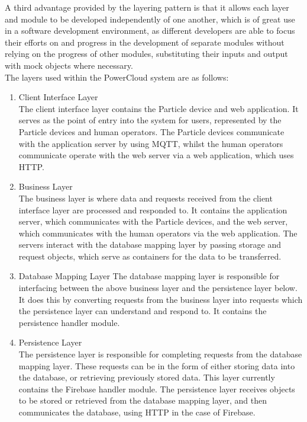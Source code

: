\documentclass{article}
\begin{document}
	A third advantage provided by the layering pattern is that it allows each 
	layer and module to be developed independently of one another, which is 
	of great use in a software development environment, as different 
	developers are able to focus their efforts on and progress in the 
	development of separate modules without relying on the progress of other 
	modules, substituting their inputs and output with mock objects where 
	necessary.\\
	
	\noindent
	The layers used within the PowerCloud system are as follows:\\
	
		\begin{enumerate}
			\item Client Interface Layer\\
			The client interface layer contains the Particle device and web 
			application. It serves as the point of entry into the system for 
			users, represented by the Particle devices and human operators. 
			The Particle devices communicate with the application server by 
			using MQTT, whilst the human operators communicate operate with 
			the web server via a web application, which uses HTTP.
			\item Business Layer\\
			The business layer is where data and requests received from the 
			client interface layer are processed and responded to. It 
			contains the application server, which communicates with the 
			Particle devices, and the web server, which communicates with the 
			human operators via the web application. The servers interact 
			with the database mapping layer by passing storage and request 
			objects, which serve as containers for the data to be transferred.
			\item Database Mapping Layer
			The database mapping layer is responsible for interfacing between 
			the above business layer and the persistence layer below. It does 
			this by converting requests from the business layer into requests 
			which the persistence layer can understand and respond to. It 
			contains the persistence handler module.
			\item Persistence Layer\\
			The persistence layer is responsible for completing requests from 
			the database mapping layer. These requests can be in the form of 
			either storing data into the database, or retrieving previously 
			stored data. This layer currently contains the Firebase handler 
			module. The persistence layer receives objects to be stored or 
			retrieved from the database mapping layer, and then communicates 
			the database, using HTTP in the case of Firebase.
		\end{enumerate}
\end{document}
